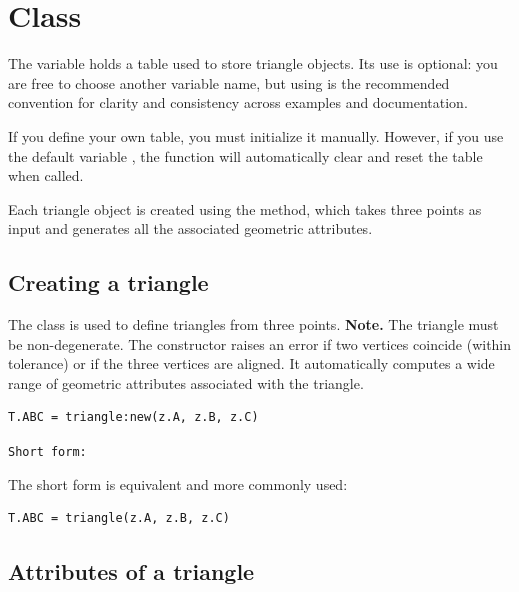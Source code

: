 \newpage
\section{Class } %


The variable  holds a table used to store triangle objects. Its use is optional: you are free to choose another variable name, but using   is the recommended convention for clarity and consistency across examples and documentation.

\medskip
If you define your own table, you must initialize it manually. However, if you use the default variable  , the  function will automatically clear and reset the   table when called.

\medskip
Each triangle object is created using the  method, which takes three points as input and generates all the associated geometric attributes.

\vspace{1em}

\subsection{Creating a triangle}
\label{sub:creating_a_triangle}

The  class is used to define triangles from three points.
\textbf{Note.} The triangle must be non-degenerate. The constructor
raises an error if two vertices coincide (within tolerance) or if
the three vertices are aligned. It automatically computes a wide range of geometric attributes associated with the triangle.

\begin{mybox}
\begin{verbatim}
T.ABC = triangle:new(z.A, z.B, z.C)
\end{verbatim}
\end{mybox}

\texttt{Short form: }

The short form  is equivalent and more commonly used:

\begin{mybox}
\begin{verbatim}
T.ABC = triangle(z.A, z.B, z.C)
\end{verbatim}
\end{mybox}


\subsection{Attributes of a triangle} %

